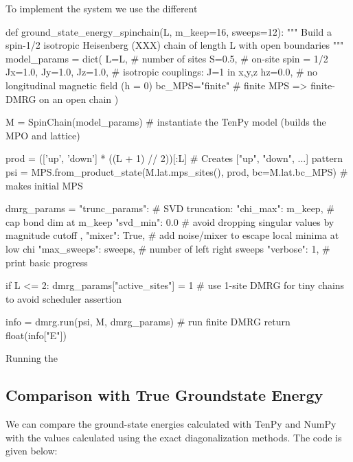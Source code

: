\documentclass{article}
\begin{document}
\noindent To implement the system we use the different 

\vspace{1em}

\begin{python}
def ground_state_energy_spinchain(L, m_keep=16, sweeps=12):
    """
    Build a spin-1/2 isotropic Heisenberg (XXX) chain of length L with open boundaries
    """
    model_params = dict(
        L=L,                     # number of sites
        S=0.5,                   # on-site spin = 1/2
        Jx=1.0, Jy=1.0, Jz=1.0,  # isotropic couplings: J=1 in x,y,z
        hz=0.0,                  # no longitudinal magnetic field (h = 0)
        bc_MPS="finite"          # finite MPS => finite-DMRG on an open chain
    )
    
    M = SpinChain(model_params) # instantiate the TenPy model (builds the MPO and lattice)

    prod = (['up', 'down'] * ((L + 1) // 2))[:L] # Creates ["up", "down", ...] pattern
    psi = MPS.from_product_state(M.lat.mps_sites(), prod, bc=M.lat.bc_MPS) # makes initial MPS

    dmrg_params = {
        "trunc_params": {        # SVD truncation:
            "chi_max": m_keep,   # cap bond dim at m_keep
            "svd_min": 0.0       # avoid dropping singular values by magnitude cutoff 
        },  
        "mixer": True,           # add noise/mixer to escape local minima at low chi
        "max_sweeps": sweeps,    # number of left right sweeps
        "verbose": 1,            # print basic progress
    }

    if L <= 2:
        dmrg_params["active_sites"] = 1 # use 1-site DMRG for tiny chains to avoid scheduler assertion

    info = dmrg.run(psi, M, dmrg_params) # run finite DMRG
    return float(info["E"])
\end{python}

\vspace{1em} Running the 

\begin{python}

\end{python}

\subsection{Comparison with True Groundstate Energy}

We can compare the ground-state energies calculated with TenPy and NumPy with the values calculated using the exact diagonalization methods. The code is given below: 
\end{document}
